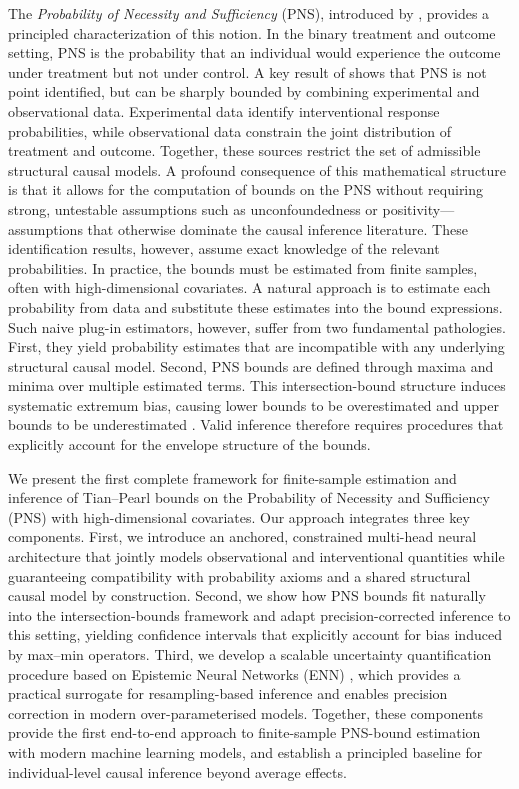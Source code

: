 \documentclass[accepted]{uai2026} %
\theoremstyle{plain}
\theoremstyle{definition}
\theoremstyle{remark}
\begin{document}
The \emph{Probability of Necessity and Sufficiency} (PNS),
introduced by \citet{tian2000probabilities},
provides a principled characterization of this notion.
In the binary treatment and outcome setting, PNS is the probability that an
individual would experience the outcome under treatment but not under
control.
A key result of \citet{tian2000probabilities} shows that PNS is not point 
identified, but can be sharply bounded by combining experimental and observational data. 
Experimental data identify interventional response probabilities, 
while observational data constrain the joint distribution of treatment and outcome. 
Together, these sources restrict the set of admissible structural causal models. 
A profound consequence of this mathematical structure is that it allows for the 
computation of bounds on the PNS without requiring strong, untestable assumptions 
such as unconfoundedness or positivity—assumptions that otherwise dominate 
the causal inference literature.
These identification results, however, assume exact knowledge of the
relevant probabilities.
In practice, the bounds must be estimated from finite samples, often with
high-dimensional covariates.
A natural approach is to estimate each probability from data and substitute 
these estimates into the bound expressions. Such naive plug-in estimators, however, 
suffer from two fundamental pathologies.
First, they yield probability estimates that are incompatible with any
underlying structural causal model.
Second, PNS bounds are defined through maxima and minima over multiple
estimated terms.
This intersection-bound structure induces systematic extremum bias, causing
lower bounds to be overestimated and upper bounds to be underestimated
\citep{chernozhukov2013intersection}.
Valid inference therefore requires procedures that explicitly account for
the envelope structure of the bounds.

We present the first complete framework for finite-sample estimation and inference of Tian–Pearl bounds on the Probability of Necessity and Sufficiency (PNS) with high-dimensional covariates. Our approach integrates three key components. First, we introduce an anchored, constrained multi-head neural architecture that jointly models observational and interventional quantities while guaranteeing compatibility with probability axioms and a shared structural causal model by construction. Second, we show how PNS bounds fit naturally into the intersection-bounds framework and adapt precision-corrected inference to this setting, yielding confidence intervals that explicitly account for bias induced by max–min operators. Third, we develop a scalable uncertainty quantification procedure based on Epistemic Neural Networks (ENN) \citep{osband2023epistemic}, which provides a practical surrogate for resampling-based inference and enables precision correction in modern over-parameterised models. Together, these components provide the first end-to-end approach to finite-sample PNS-bound estimation with modern machine learning models, and establish a principled baseline for individual-level causal inference beyond average effects.
\end{document}
